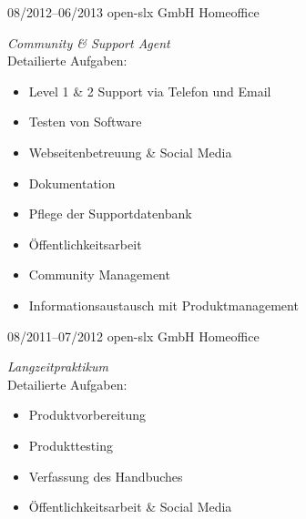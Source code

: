 \documentclass[a4paper,latin]{friggeri-cv} %
\begin{document}
\begin{entrylist}
{\begin{itemize}
\end{itemize}
}
\entry
{08/2012--06/2013}
{open-slx GmbH}
{Homeoffice}
{\emph{Community \& Support Agent} \\
Detailierte Aufgaben:
\begin{itemize}
\item Level 1 \& 2 Support via Telefon und Email
\item Testen von Software
\item Webseitenbetreuung \& Social Media
\item Dokumentation
\item Pflege der Supportdatenbank
\item Öffentlichkeitsarbeit
\item Community Management
\item Informationsaustausch mit Produktmanagement
\end{itemize}
}
\entry
{08/2011--07/2012}
{open-slx GmbH}
{Homeoffice}
{\emph{Langzeitpraktikum} \\
Detailierte Aufgaben:
\begin{itemize}
\item Produktvorbereitung
\item Produkttesting
\item Verfassung des Handbuches
\item Öffentlichkeitsarbeit \& Social Media
\end{itemize}
}
\end{entrylist}
\end{document}
